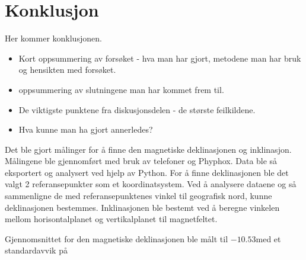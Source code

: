 \section{Konklusjon}
Her kommer konklusjonen.

\begin{itemize}
    \item Kort oppsummering av forsøket - hva man har gjort, metodene man har bruk og hensikten med forsøket. 
    \item oppsummering av slutningene man har kommet frem til.
    \item De viktigste punktene fra diskusjonsdelen - de største feilkildene. 
    \item Hva kunne man ha gjort annerledes?
\end{itemize}

Det ble gjort målinger for å finne den magnetiske deklinasjonen og inklinasjon. Målingene ble gjennomført med bruk av telefoner og Phyphox. Data ble så eksportert og analysert ved hjelp av Python. For å finne deklinasjonen ble det valgt 2 referansepunkter som et koordinatsystem. Ved å analysere dataene og så sammenligne de med referansepunktenes vinkel til geografisk nord, kunne deklinasjonen bestemmes. Inklinasjonen ble bestemt ved å beregne vinkelen mellom horisontalplanet og vertikalplanet til magnetfeltet. 

Gjennomsnittet for den magnetiske deklinasjonen ble målt til $-10.53$\textdegree med et standardavvik på 
